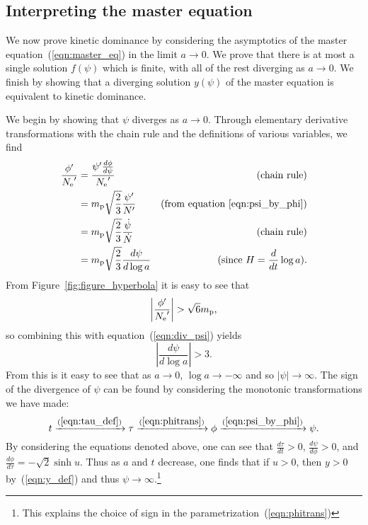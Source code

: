 \subsection{Interpreting the master equation}
\label{sec:interpreting_the_master_equation}

We now prove kinetic dominance by considering the asymptotics of the master equation~(\ref{eqn:master_eq}) in the limit $a\rightarrow0$. We prove that there is at most a single solution $f(\psi)$ which is finite, with all of the rest diverging as $a\rightarrow0$. We finish by showing that a diverging solution $y(\psi)$ of the master equation is equivalent to kinetic dominance.

We begin by showing that $\psi$ diverges as $a\rightarrow0$. Through elementary derivative transformations with the chain rule and the definitions of various variables, we find
%
\begin{align}
  \frac{{{\phi}^\prime}}{{{N_\mathrm{e}}^\prime}} 
  &=
  \frac{{{\psi}^\prime}\frac{d\phi}{d\psi}}{{{N_\mathrm{e}}^\prime}}
  &\text{(chain rule)} 
  \nonumber
  \\
  &=
  m_{\mathrm{p}}\sqrt{\frac{2}{3}}\frac{{{\psi}^\prime}}{{{N}^\prime}}  
  &\text{(from equation \protect\ref{eqn:psi_by_phi})} 
  \nonumber
  \\
  &=
  m_{\mathrm{p}}\sqrt{\frac{2}{3}}\frac{\dot\psi}{\dot{N}}  
  &\text{(chain rule)} 
  \nonumber
  \\
  &=
  m_{\mathrm{p}}\sqrt{\frac{2}{3}}\frac{d\psi}{d\log a}
  &\text{(since $H=\frac{d}{dt}\log a$)}.
  \label{eqn:div_psi}
\end{align}
%
From Figure~\ref{fig:figure_hyperbola} it is easy to see that
%
\begin{equation}
  \left|\frac{{{\phi}^\prime}}{{{N_\mathrm{e}}^\prime}}\right| > \sqrt{6}m_{\mathrm{p}}, 
\end{equation}
%
so combining this with equation~(\ref{eqn:div_psi}) yields
%
\begin{equation}
  \left|\frac{d\psi}{d\log a}\right| > 3. 
\end{equation}
%
From this is it easy to see that as $a\to0$, $\log a\to-\infty$ and so $|\psi|\to\infty$. The sign of the divergence of $\psi$ can be found by considering the monotonic transformations we have made: %
\begin{equation}
  t
  \xrightarrow{\protect(\ref{eqn:tau_def})}
  \tau
  \xrightarrow{\protect(\ref{eqn:phitrans})}
  \phi
  \xrightarrow{\protect(\ref{eqn:psi_by_phi})}
  \psi.
\end{equation}
%
By considering the equations denoted above, one can see that $\frac{d\tau}{dt}>0$, $\frac{d\psi}{d\phi}>0$, and $\frac{d\phi}{d\tau} = -\sqrt{2}\sinh u$. Thus as $a$ and $t$ decrease, one finds that if $u>0$, then $y>0$ by~(\ref{eqn:y_def}) and thus $\psi\to\infty$.\footnote{This explains the choice of sign in the parametrization~\protect(\ref{eqn:phitrans})}



